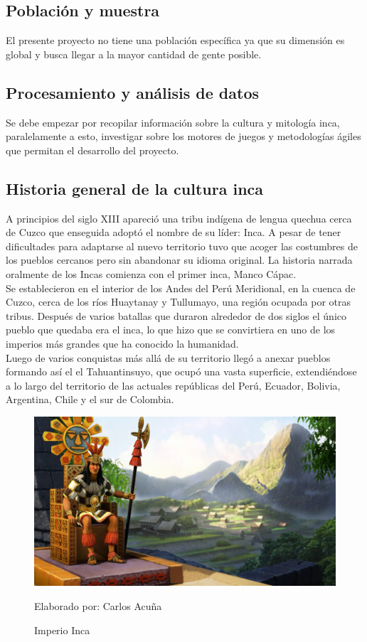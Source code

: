 \documentclass[a4paper, openright, 12pt]{report}
\begin{document}
\subsection{Población y muestra}
\justify
El presente proyecto no tiene una población específica ya que su dimensión es global y busca llegar a la mayor cantidad de gente posible.

\subsection{Procesamiento y análisis de datos} 
\justify
Se debe empezar por recopilar información sobre la cultura y mitología inca, paralelamente a esto, investigar sobre los motores de juegos y metodologías ágiles que permitan el desarrollo del proyecto.

\subsection*{Historia general de la cultura inca}
\justify
A principios del siglo XIII apareció una tribu indígena de lengua quechua cerca de Cuzco que enseguida adoptó el nombre de su líder: Inca. A pesar de tener dificultades para adaptarse al nuevo territorio tuvo que acoger las costumbres de los pueblos cercanos pero sin abandonar su idioma original. La historia narrada oralmente de los Incas comienza con el primer inca, Manco Cápac.\\
Se establecieron en el interior de los Andes del Perú Meridional, en la cuenca de Cuzco, cerca de los ríos Huaytanay y Tullumayo, una región ocupada por otras tribus. Después de varios batallas que duraron alrededor de dos siglos el único pueblo que quedaba era el inca, lo que hizo que se convirtiera en uno de los imperios más grandes que ha conocido la humanidad.\\
Luego de varios conquistas más allá de su territorio llegó a anexar pueblos formando así el el Tahuantinsuyo, que ocupó una vasta superficie, extendiéndose a lo largo del territorio de las actuales repúblicas del Perú, Ecuador, Bolivia, Argentina, Chile y el sur de Colombia.\cite{baudouin2012incas}

\begin{figure}[h]
\captionsetup{justification=centering,margin=2cm}
\includegraphics[scale=0.2]{h1}
\centering
\caption{Imperio Inca}
Elaborado por: Carlos Acuña
\label{fig:h1}
\end{figure}
  
\end{document}

